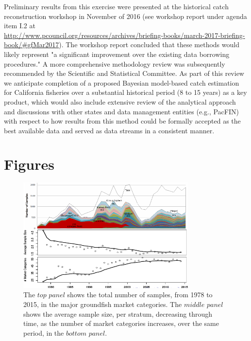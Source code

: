 \documentclass[12pt]{article}
\begin{document}
Preliminary results from this exercise were presented at the historical catch
reconstruction workshop in November of 2016 (see workshop report under agenda item I.2 at \\
\href{http://www.pcouncil.org/resources/archives/briefing-books/march-2017-briefing-book/#gfMar2017}{\mbox{http://www.pcouncil.org/resources/archives/briefing-books/march-2017-briefing-book/\#gfMar2017}}).
The workshop report concluded that these methods would likely represent "a
significant improvement over the existing data borrowing procedures."  A more
comprehensive methodology review was subsequently recommended by the
Scientific and Statistical Committee.  As part of this review we anticipate
completion of a proposed Bayesian model-based catch estimation for California
fisheries over a substantial historical period (8 to 15 years) as a key
product, which would also include extensive review of the analytical approach
and discussions with other states and data management entities (e.g., PacFIN)
with respect to how results from this method could be formally accepted as the
best available data and served as data streams in a consistent manner. 

%
\clearpage
{}

%
%

%
\section*{Figures}
%
\begin{figure}[h!]
	\centering
        \includegraphics[width=0.8\textwidth]{sampleComplex.png}
        \caption{
                The $top$ $panel$ shows the total number of samples, from 1978 to 2015, in the major groundfish market categories.
                The $middle$ $panel$ shows the average sample size, per stratum, decreasing through time, as the number of market categories increases, over the same period, in the $bottom$ $panel$.
        }
\end{figure}
\end{document}
